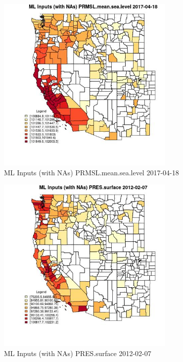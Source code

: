 \begin{figure} 
\centering  
\includegraphics[width=0.77\textwidth]{Code_Outputs/Report_ML_input_PM25_Step4_part_f_de_duplicated_aves_prioritize_24hr_obswNAs_CountyPRMSLmeansealevelMean2017-04-18.jpg} 
\caption{\label{fig:Report_ML_input_PM25_Step4_part_f_de_duplicated_aves_prioritize_24hr_obswNAsCountyPRMSLmeansealevelMean2017-04-18}ML Inputs (with NAs) PRMSL.mean.sea.level 2017-04-18} 
\end{figure} 
 

\begin{figure} 
\centering  
\includegraphics[width=0.77\textwidth]{Code_Outputs/Report_ML_input_PM25_Step4_part_f_de_duplicated_aves_prioritize_24hr_obswNAs_CountyPRESsurfaceMean2012-02-07.jpg} 
\caption{\label{fig:Report_ML_input_PM25_Step4_part_f_de_duplicated_aves_prioritize_24hr_obswNAsCountyPRESsurfaceMean2012-02-07}ML Inputs (with NAs) PRES.surface 2012-02-07} 
\end{figure} 
 

